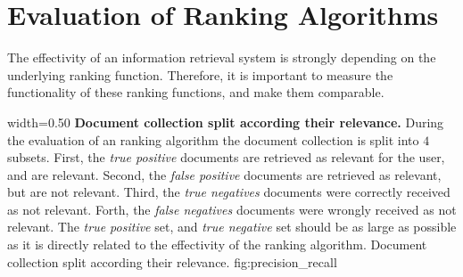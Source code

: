 

\section{Evaluation of Ranking Algorithms}
\label{sec:evaluation_of_ranking_algorithms}

The effectivity of an information retrieval system is strongly depending on the underlying ranking function. Therefore, it is important to measure the functionality of these ranking functions, and make them comparable.

      {width=0.50\textwidth}
      {\textbf{Document collection split according their relevance.} During the evaluation of an ranking algorithm the document collection is split into $4$ subsets. First, the \textit{true positive} documents are retrieved as relevant for the user, and are relevant. Second, the \textit{false positive} documents are retrieved as relevant, but are not relevant. Third, the \textit{true negatives} documents were correctly received as not relevant. Forth, the \textit{false negatives} documents were wrongly received as not relevant. The \textit{true positive} set, and \textit{true negative} set should be as large as possible as it is directly related to the effectivity of the ranking algorithm.}
      {Document collection split according their relevance.}
      {fig:precision_recall}

